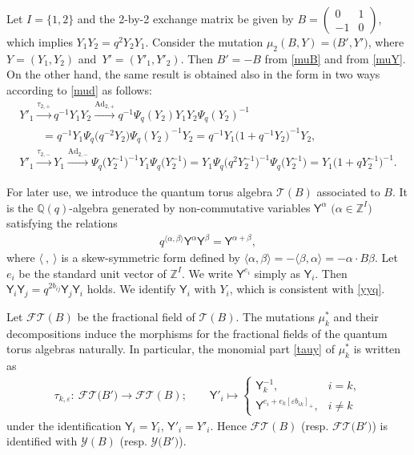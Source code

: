 \documentclass[pdftex]{sigma}
\newcommand{\Z}{{\mathbb Z}}
\def\ve{{\varepsilon}}
\newcommand\rY{{\mathsf{Y}}}
\newcommand\bY{Y}
\numberwithin{equation}{section}
\begin{document}
\begin{Example}
 Let $I = \{1,2\}$ and the 2-by-2 exchange matrix be given by
 $B = \left(\begin{smallmatrix}0 & 1 \\ -1 & 0 \end{smallmatrix}\right)$, which implies
 $Y_1Y_2 = q^2Y_2Y_1$. Consider the mutation
 $\mu_2(B,\bY) = \bigl(B', \bY'\bigr)$, where $\bY = (Y_1, Y_2)$ and~${\bY' = (Y'_1, Y'_2)}$. Then $B'=-B$ from \eqref{muB} and
  from \eqref{muY}. On the other hand,
 the same result is obtained also in the form
  in two ways according to
 \eqref{mud} as follows:
\begin{gather*}
Y'_1 \overset{\tau_{2,+}}{\longrightarrow} q^{-1}Y_1Y_2
\overset{\mathrm{Ad}_{2,+}}{\longrightarrow} q^{-1}\Psi_q(Y_2)Y_1Y_2\Psi_q(Y_2)^{-1}\\
\qquad= q^{-1}Y_1\Psi_q\bigl(q^{-2}Y_2\bigr)\Psi_q(Y_2)^{-1}Y_2
= q^{-1}Y_1\bigl(1+q^{-1}Y_2\bigr)^{-1}Y_2,
\\
Y'_1 \overset{\tau_{2,-}}{\longrightarrow} Y_1
\overset{\mathrm{Ad}_{2,-}}{\longrightarrow} \Psi_q\bigl(Y_2^{-1}\bigr)^{-1}Y_1 \Psi_q\bigl(Y_2^{-1}\bigr)
= Y_1\Psi_q\bigl(q^2Y_2^{-1}\bigr)^{-1}\Psi_q\bigl(Y_2^{-1}\bigr) =Y_1\bigl(1+qY^{-1}_2\bigr)^{-1}.
\end{gather*}
\end{Example}

For later use, we introduce the quantum torus algebra $\mathcal{T}(B)$ associated to $B$.
It is the $\mathbb{Q}(q)$-algebra generated by
non-commutative variables $\rY^\alpha$ $\bigl(\alpha \in \Z^{I}\bigr)$ satisfying the
relations
\begin{align}\label{qyy}
q^{\langle \alpha,\beta \rangle} \rY^\alpha \rY^\beta
= \rY^{\alpha + \beta},
\end{align}
where $\langle ~,~ \rangle$ is a skew-symmetric form defined by
$\langle \alpha,\beta \rangle = - \langle \beta,\alpha \rangle =
-\alpha \cdot B \beta$.
Let $e_i$ be the standard unit vector of
$\Z^I$. We write $\rY^{e_i}$ simply as $\rY_i$. Then
$\rY_i \rY_j = q^{2 b_{ij}} \rY_j \rY_i$ holds. We identify $\rY_i$ with
$Y_i$, which is consistent with \eqref{yyq}.

Let $\mathcal{FT}(B)$ be the fractional field of $\mathcal{T}(B)$.
The mutations $\mu_k^{\ast}$
and their decompositions
induce the morphisms for the fractional fields of the quantum torus algebras naturally.
%
In particular, the monomial part \eqref{tauy} of $\mu_k^{\ast}$ is written as
\begin{align}\label{taft}
\tau_{k,\ve} \colon\ \mathcal{FT}\bigl(B'\bigr) \to \mathcal{FT}(B); \qquad
\rY'_i \mapsto \begin{cases}
\rY_k^{-1}, & i= k,
\\
\rY^{e_i + e_k [\ve b_{ik}]_+}, & i \neq k
\end{cases}
\end{align}
under the identification $\rY_i = Y_i$, $\rY'_i = Y'_i$.
Hence $\mathcal{FT}(B)$ (resp. $\mathcal{FT}\bigl(B'\bigr)$) is identified with $\mathcal{Y}(B)$ (resp. $\mathcal{Y}\bigl(B'\bigr)$).
\end{document}
